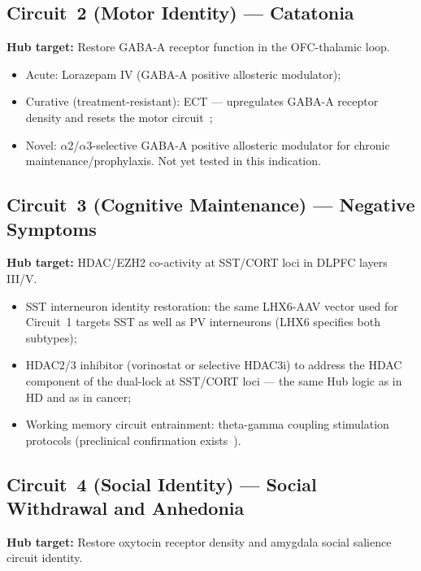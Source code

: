\documentclass[12pt,a4paper]{article}
\begin{document}
\subsection{Circuit~2 (Motor Identity) --- Catatonia}

\textbf{Hub target:} Restore GABA-A receptor function in
the OFC-thalamic loop.

\begin{itemize}
  \item Acute: Lorazepam IV (GABA-A positive allosteric
    modulator);
  \item Curative (treatment-resistant): ECT --- upregulates
    GABA-A receptor density and resets the motor
    circuit~\cite{Sienaert2014};
  \item Novel: $\alpha$2/$\alpha$3-selective GABA-A
    positive allosteric modulator for chronic
    maintenance/prophylaxis. Not yet tested in this
    indication.
\end{itemize}

\subsection{Circuit~3 (Cognitive Maintenance) --- Negative
Symptoms}

\textbf{Hub target:} HDAC/EZH2 co-activity at SST/CORT
loci in DLPFC layers III/V.

\begin{itemize}
  \item SST interneuron identity restoration: the same
    LHX6-AAV vector used for Circuit~1 targets SST as
    well as PV interneurons (LHX6 specifies both subtypes);
  \item HDAC2/3 inhibitor (vorinostat or selective HDAC3i)
    to address the HDAC component of the dual-lock at
    SST/CORT loci --- the same Hub logic as in HD
    and as in cancer;
  \item Working memory circuit entrainment: theta-gamma
    coupling stimulation protocols (preclinical confirmation
    exists~\cite{ThetaGamma2022}).
\end{itemize}

\subsection{Circuit~4 (Social Identity) ---
Social Withdrawal and Anhedonia}

\textbf{Hub target:} Restore oxytocin receptor density
and amygdala social salience circuit identity.
\end{document}
